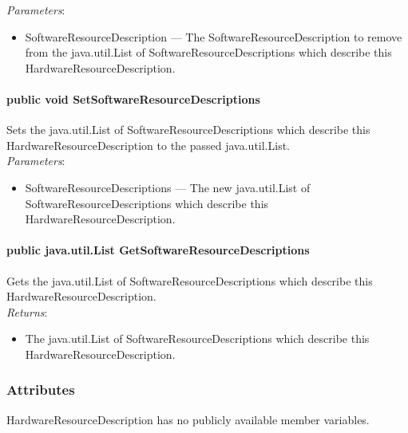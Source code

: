 \documentclass[$Date: 2003/06/26 19:29:31 $]{glabarticle}
\begin{document}
\textit{Parameters}:
\begin{itemize}
\item[] SoftwareResourceDescription --- The SoftwareResourceDescription to remove from the java.util.List of SoftwareResourceDescriptions which describe this HardwareResourceDescription.
\end{itemize}

\paragraph{public void SetSoftwareResourceDescriptions}

Sets the java.util.List of SoftwareResourceDescriptions which describe this
HardwareResourceDescription to the passed java.util.List. \\

\textit{Parameters}:
\begin{itemize}
\item[] SoftwareResourceDescriptions --- The new java.util.List of SoftwareResourceDescriptions which describe 
this HardwareResourceDescription.
\end{itemize}

\paragraph{public java.util.List GetSoftwareResourceDescriptions}

Gets the java.util.List of SoftwareResourceDescriptions which describe this HardwareResourceDescription. \\

\textit{Returns}:
\begin{itemize}
\item[] The java.util.List of SoftwareResourceDescriptions which describe this 
HardwareResourceDescription.
\end{itemize}



\subsubsection{Attributes}

HardwareResourceDescription has no publicly available member variables.

\end{document}
